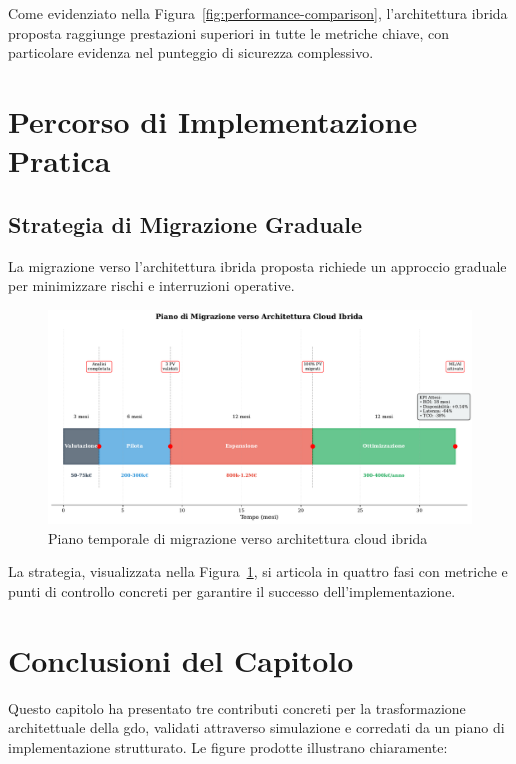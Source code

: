 \documentclass[12pt,a4paper,oneside]{book}
\begin{document}
Come evidenziato nella Figura~\ref{fig:performance-comparison}, l'architettura ibrida proposta raggiunge prestazioni superiori in tutte le metriche chiave, con particolare evidenza nel punteggio di sicurezza complessivo.

\section{Percorso di Implementazione Pratica}
\label{sec:implementazione}

\subsection{Strategia di Migrazione Graduale}
\label{subsec:migrazione-graduale}

La migrazione verso l'architettura ibrida proposta richiede un approccio graduale per minimizzare rischi e interruzioni operative.

\begin{figure}[htbp]
\centering
\includegraphics[width=\textwidth]{fig_3_5_migration_timeline.pdf}
\caption{Piano temporale di migrazione verso architettura cloud ibrida}
\label{fig:migration-timeline}
\end{figure}

La strategia, visualizzata nella Figura~\ref{fig:migration-timeline}, si articola in quattro fasi con metriche e punti di controllo concreti per garantire il successo dell'implementazione.

\section{Conclusioni del Capitolo}
\label{sec:conclusioni-cap3}

Questo capitolo ha presentato tre contributi concreti per la trasformazione architettuale della \gls{gdo}, validati attraverso simulazione e corredati da un piano di implementazione strutturato. Le figure prodotte illustrano chiaramente:
\end{document}
